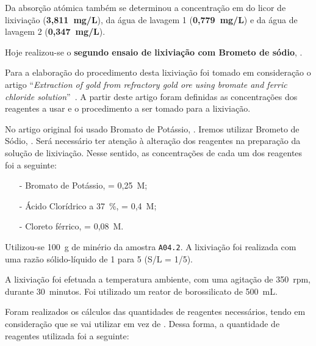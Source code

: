Da absorção atómica também se determinou a concentração em  do licor de lixiviação (\textbf{3,811~mg/L}), da água de lavagem 1 (\textbf{0,779~mg/L}) e da água de lavagem 2 (\textbf{0,347~mg/L}).


\label{day:14-janeiro-2025}

Hoje realizou-se o \textbf{segundo ensaio de lixiviação com Brometo de sódio}, \bromo{}. 

Para a elaboração do procedimento desta lixiviação foi tomado em consideração o artigo ``\emph{Extraction of gold from refractory gold ore using bromate and ferric chloride solution}''~\cite{bromo2_2019}.
A partir deste artigo foram definidas as concentrações dos reagentes a usar e o procedimento a ser tomado para a lixiviação.

No artigo original foi usado Bromato de Potássio, \bromopot{}.
Iremos utilizar Brometo de Sódio, \bromo{}.
Será necessário ter atenção à alteração dos reagentes na preparação da solução de lixiviação.
Nesse sentido, as concentrações de cada um dos reagentes foi a seguinte:

\begin{itemize}
	\item[-] Bromato de Potássio, \bromopot{} = 0,25~M;
	\item[-] Ácido Clorídrico a 37~\%, \acl{} = 0,4~M;
	\item[-] Cloreto férrico, \cloretofe{} = 0,08~M.
\end{itemize}

Utilizou-se 100~g de minério da amostra \texttt{A04.2}.
A lixiviação foi realizada com uma razão sólido-líquido de 1 para 5 (S/L = 1/5).

A lixiviação foi efetuada a temperatura ambiente, com uma agitação de 350~rpm, durante 30~minutos.
Foi utilizado um reator de borossilicato de 500~mL.

Foram realizados os cálculos das quantidades de reagentes necessários, tendo em consideração que se vai utilizar \bromo{} em vez de \bromopot{}.
Dessa forma, a quantidade de reagentes utilizada foi a seguinte:


